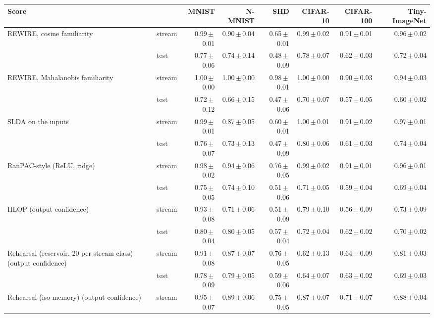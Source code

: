 \begin{tabular*}{\textwidth}{@{\extracolsep{\fill}}p{3.6cm}p{0.9cm}rrrrrr@{}}
\toprule
Score & & MNIST & N-MNIST & SHD & CIFAR-10 & CIFAR-100 & Tiny-ImageNet \\
\midrule
REWIRE, cosine familiarity & stream & 0.99\,$\pm$\,0.01 & 0.90\,$\pm$\,0.04 & 0.65\,$\pm$\,0.01 & 0.99\,$\pm$\,0.02 & 0.91\,$\pm$\,0.01 & 0.96\,$\pm$\,0.02 \\
 & test & 0.77\,$\pm$\,0.06 & 0.74\,$\pm$\,0.14 & 0.48\,$\pm$\,0.09 & 0.78\,$\pm$\,0.07 & 0.62\,$\pm$\,0.03 & 0.72\,$\pm$\,0.04 \\
REWIRE, Mahalanobis familiarity & stream & 1.00\,$\pm$\,0.00 & 1.00\,$\pm$\,0.00 & 0.98\,$\pm$\,0.01 & 1.00\,$\pm$\,0.00 & 0.90\,$\pm$\,0.03 & 0.94\,$\pm$\,0.03 \\
 & test & 0.72\,$\pm$\,0.12 & 0.66\,$\pm$\,0.15 & 0.47\,$\pm$\,0.06 & 0.70\,$\pm$\,0.07 & 0.57\,$\pm$\,0.05 & 0.60\,$\pm$\,0.02 \\
SLDA on the inputs & stream & 0.99\,$\pm$\,0.01 & 0.87\,$\pm$\,0.05 & 0.60\,$\pm$\,0.01 & 1.00\,$\pm$\,0.01 & 0.91\,$\pm$\,0.02 & 0.97\,$\pm$\,0.01 \\
 & test & 0.76\,$\pm$\,0.07 & 0.73\,$\pm$\,0.13 & 0.47\,$\pm$\,0.09 & 0.80\,$\pm$\,0.06 & 0.61\,$\pm$\,0.03 & 0.74\,$\pm$\,0.04 \\
RanPAC-style (ReLU, ridge) & stream & 0.98\,$\pm$\,0.02 & 0.94\,$\pm$\,0.06 & 0.76\,$\pm$\,0.05 & 0.99\,$\pm$\,0.02 & 0.91\,$\pm$\,0.01 & 0.96\,$\pm$\,0.01 \\
 & test & 0.75\,$\pm$\,0.05 & 0.74\,$\pm$\,0.10 & 0.51\,$\pm$\,0.06 & 0.71\,$\pm$\,0.05 & 0.59\,$\pm$\,0.04 & 0.69\,$\pm$\,0.04 \\
HLOP (output confidence) & stream & 0.93\,$\pm$\,0.08 & 0.71\,$\pm$\,0.06 & 0.51\,$\pm$\,0.09 & 0.79\,$\pm$\,0.10 & 0.56\,$\pm$\,0.09 & 0.73\,$\pm$\,0.09 \\
 & test & 0.80\,$\pm$\,0.04 & 0.80\,$\pm$\,0.05 & 0.57\,$\pm$\,0.04 & 0.72\,$\pm$\,0.04 & 0.62\,$\pm$\,0.02 & 0.70\,$\pm$\,0.02 \\
Rehearsal (reservoir, 20 per stream class) (output confidence) & stream & 0.91\,$\pm$\,0.08 & 0.87\,$\pm$\,0.07 & 0.76\,$\pm$\,0.05 & 0.62\,$\pm$\,0.13 & 0.64\,$\pm$\,0.09 & 0.81\,$\pm$\,0.03 \\
 & test & 0.78\,$\pm$\,0.09 & 0.79\,$\pm$\,0.05 & 0.59\,$\pm$\,0.06 & 0.64\,$\pm$\,0.07 & 0.63\,$\pm$\,0.02 & 0.69\,$\pm$\,0.03 \\
Rehearsal (iso-memory) (output confidence) & stream & 0.95\,$\pm$\,0.07 & 0.89\,$\pm$\,0.06 & 0.75\,$\pm$\,0.05 & 0.87\,$\pm$\,0.07 & 0.71\,$\pm$\,0.07 & 0.88\,$\pm$\,0.04 \\

\end{tabular*}
